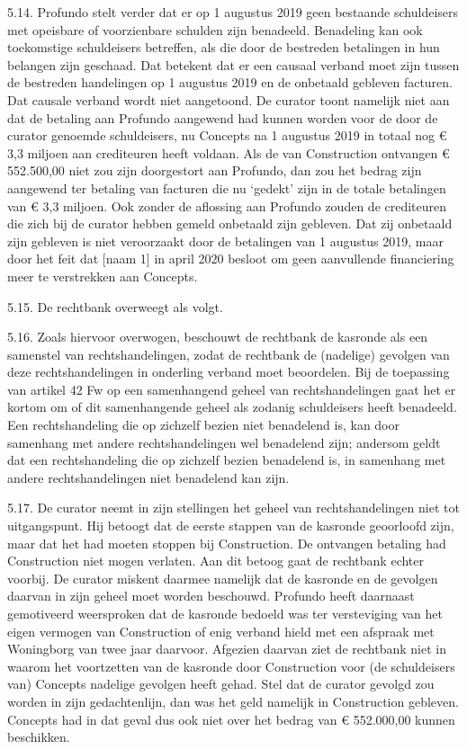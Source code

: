 \documentclass[
  dutch,
  a4paper,
]{article}
\begin{document}
5.14. Profundo stelt verder dat er op 1 augustus 2019 geen bestaande schuldeisers met opeisbare of voorzienbare schulden zijn benadeeld. Benadeling kan ook toekomstige schuldeisers betreffen, als die door de bestreden betalingen in hun belangen zijn geschaad. Dat betekent dat er een causaal verband moet zijn tussen de bestreden handelingen op 1 augustus 2019 en de onbetaald gebleven facturen. Dat causale verband wordt niet aangetoond. De curator toont namelijk niet aan dat de betaling aan Profundo aangewend had kunnen worden voor de door de curator genoemde schuldeisers, nu Concepts na 1 augustus 2019 in totaal nog € 3,3 miljoen aan crediteuren heeft voldaan. Als de van Construction ontvangen € 552.500,00 niet zou zijn doorgestort aan Profundo, dan zou het bedrag zijn aangewend ter betaling van facturen die nu `gedekt' zijn in de totale betalingen van € 3,3 miljoen. Ook zonder de aflossing aan Profundo zouden de crediteuren die zich bij de curator hebben gemeld onbetaald zijn gebleven. Dat zij onbetaald zijn gebleven is niet veroorzaakt door de betalingen van 1 augustus 2019, maar door het feit dat {[}naam 1{]} in april 2020 besloot om geen aanvullende financiering meer te verstrekken aan Concepts.

5.15. De rechtbank overweegt als volgt.

5.16. Zoals hiervoor overwogen, beschouwt de rechtbank de kasronde als een samenstel van rechtshandelingen, zodat de rechtbank de (nadelige) gevolgen van deze rechtshandelingen in onderling verband moet beoordelen. Bij de toepassing van artikel 42 Fw op een samenhangend geheel van rechtshandelingen gaat het er kortom om of dit samenhangende geheel als zodanig schuldeisers heeft benadeeld. Een rechtshandeling die op zichzelf bezien niet benadelend is, kan door samenhang met andere rechtshandelingen wel benadelend zijn; andersom geldt dat een rechtshandeling die op zichzelf bezien benadelend is, in samenhang met andere rechtshandelingen niet benadelend kan zijn.

5.17. De curator neemt in zijn stellingen het geheel van rechtshandelingen niet tot uitgangspunt. Hij betoogt dat de eerste stappen van de kasronde geoorloofd zijn, maar dat het had moeten stoppen bij Construction. De ontvangen betaling had Construction niet mogen verlaten. Aan dit betoog gaat de rechtbank echter voorbij. De curator miskent daarmee namelijk dat de kasronde en de gevolgen daarvan in zijn geheel moet worden beschouwd. Profundo heeft daarnaast gemotiveerd weersproken dat de kasronde bedoeld was ter versteviging van het eigen vermogen van Construction of enig verband hield met een afspraak met Woningborg van twee jaar daarvoor. Afgezien daarvan ziet de rechtbank niet in waarom het voortzetten van de kasronde door Construction voor (de schuldeisers van) Concepts nadelige gevolgen heeft gehad. Stel dat de curator gevolgd zou worden in zijn gedachtenlijn, dan was het geld namelijk in Construction gebleven. Concepts had in dat geval dus ook niet over het bedrag van € 552.000,00 kunnen beschikken.
\end{document}

